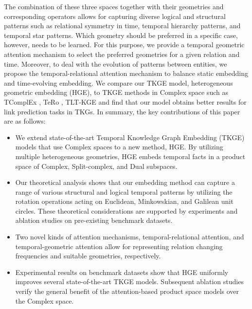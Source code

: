 \documentclass[letterpaper]{article} %
\begin{document}
The combination of these three spaces together with their geometries and corresponding operators allows for capturing diverse logical and structural patterns such as relational symmetry in time, temporal hierarchy patterns, and temporal star patterns.
Which geometry should be preferred in a specific case, however, needs to be learned.
For this purpose, we provide a temporal geometric attention mechanism to select the preferred geometries for a given relation and time.
Moreover, to deal with the evolution of patterns between entities, we propose the temporal-relational attention mechanism to balance static embedding and time-evolving embedding.
We compare our TKGE model, heterogeneous geometric embedding (HGE), to TKGE methods in Complex space such as TComplEx \cite{tcomplexlacroix2020tensor}, TeRo \cite{xu2020tero}, TLT-KGE \cite{tltcomplexzhang2022along} and find that our model obtains better results for link prediction tasks in TKGs.
In summary, the key contributions of this paper are as follows:
\begin{itemize}
    \item We extend state-of-the-art Temporal Knowledge Graph Embedding (TKGE) models that use Complex spaces to a new method, HGE. By utilizing multiple heterogeneous geometries, HGE embeds temporal facts in a product space of Complex, Split-complex, and Dual subspaces.
    \item Our theoretical analysis shows that our embedding method can capture a range of various structural and logical temporal patterns by utilizing the rotation operations acting on  Euclidean, Minkowskian, and Galilean unit circles.
    These theoretical considerations are supported by experiments and ablation studies on pre-existing benchmark datasets.
    \item Two novel kinds of attention mechanisms, temporal-relational attention, and temporal-geometric attention allow for representing relation changing frequencies and suitable geometries, respectively.
    \item Experimental results on benchmark datasets show that HGE uniformly improves several state-of-the-art TKGE models. Subsequent ablation studies verify the general benefit of the attention-based product space models over the Complex space.
\end{itemize}
\end{document}
